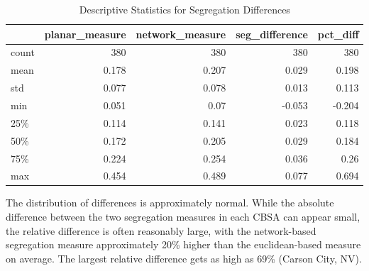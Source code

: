 \documentclass[
  10pt,
]{article}
\begin{document}
\begin{table}[h]

\begin{center}
\begin{tabular}{lrrrr}
\hline
       &   planar\_measure &   network\_measure &   seg\_difference &   pct\_diff \\
\hline
 count &          380     &           380     &          380     &    380     \\
 mean  &            0.178 &             0.207 &            0.029 &      0.198 \\
 std   &            0.077 &             0.078 &            0.013 &      0.113 \\
 min   &            0.051 &             0.07  &           -0.053 &     -0.204 \\
 25\%   &            0.114 &             0.141 &            0.023 &      0.118 \\
 50\%   &            0.172 &             0.205 &            0.029 &      0.184 \\
 75\%   &            0.224 &             0.254 &            0.036 &      0.26  \\
 max   &            0.454 &             0.489 &            0.077 &      0.694 \\
\hline
\end{tabular}


\caption{Descriptive Statistics for Segregation Differences}
\label{tbl:diff_descriptives}
\end{center}
\end{table}

The distribution of differences is approximately normal. While the
absolute difference between the two segregation measures in each CBSA
can appear small, the relative difference is often reasonably large,
with the network-based segregation measure approximately 20\% higher
than the euclidean-based measure on average. The largest relative
difference gets as high as 69\% (Carson City, NV).
\end{document}
